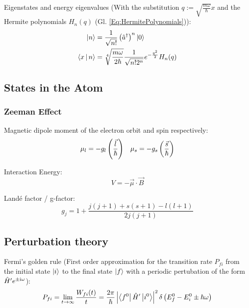 			\noindent
			Eigenstates and energy eigenvalues (With the substitution $q:=\sqrt{\frac{m\omega}{\hbar}}x$ and the Hermite polynomials $H_n(q)$ (Gl. \ref{Eq:HermitePolynomials})):
			\begin{equation}
				\begin{aligned}
					\Ket{n} &= \frac{1}{\sqrt{n!}}\left(\hat{a}^\dagger\right)^n\Ket{0} \\
					\Braket{x|n} &= \sqrt[4]{\frac{m\omega}{2\hbar}} \frac{1}{\sqrt{n! 2^n}} e^{-\frac{q^2}{2}} H_n(q) \\
				\end{aligned}
			\end{equation}

	\subsection{States in the Atom}
		\subsubsection{Zeeman Effect}
			\noindent
			Magnetic dipole moment of the electron orbit and spin respectively:
			\begin{equation}
				\begin{aligned}
					\mu_l = -g_l\left( \frac{\vec{l}}{\hbar} \right) &&
					\mu_s = -g_s\left( \frac{\vec{s}}{\hbar} \right) \\
				\end{aligned}
			\end{equation}

			Interaction Energy:
			\begin{equation}
				V = -\vec{\mu} \cdot \vec{B}
			\end{equation}

			Landé factor / g-factor:
			\begin{equation}
				g_j = 1+\frac{j(j+1) + s(s+1) - l(l+1)}{2j(j+1)}
			\end{equation}


	\subsection{Perturbation theory}
		\noindent
		Fermi's golden rule (First order approximation for the transition rate $P_{fi}$ from the initial state $\Ket{i}$ to the final state $\Ket{f}$ with a periodic pertubation of the form $\hat{H}' e^{\pm\mathrm{i}\omega}$):
		\begin{equation}
			P_{fi} = \lim_{t\rightarrow\infty} \frac{W_{fi}(t)}{t} = \frac{2\pi}{\hbar} \left| \Bra{f^0}\hat{H}'\Ket{i^0} \right|^2 \delta\left( E_f^0 - E_i^0 \pm \hbar\omega \right)
		\end{equation}


